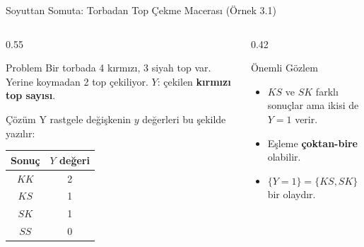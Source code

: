 ﻿\documentclass[light]{lutbeamer}
\begin{document}
\begin{frame}{Soyuttan Somuta: Torbadan Top Çekme Macerası (Örnek 3.1)}
\footnotesize
\begin{columns}[T]
  \begin{column}{0.55\textwidth}
    \begin{block}{Problem}
      Bir torbada 4 kırmızı, 3 siyah top var. Yerine koymadan 2 top çekiliyor.
      $Y$: çekilen \textbf{kırmızı top sayısı}.
    \end{block}

    \begin{alertblock}{Çözüm}
      Y rastgele değişkenin $y$ değerleri bu şekilde yazılır:
      \vspace{0.15cm}\\
      \centering
      \begin{tabular}{cc}
        \toprule
        Sonuç & $Y$ değeri \\
        \midrule
        $KK$ & 2 \\
        $KS$ & 1 \\
        $SK$ & 1 \\
        $SS$ & 0 \\
        \bottomrule
      \end{tabular}
    \end{alertblock}
  \end{column}
  \begin{column}{0.42\textwidth}
    \begin{block}{Önemli Gözlem}
      \begin{itemize}
        \item $KS$ ve $SK$ farklı sonuçlar ama ikisi de $Y=1$ verir.
        \item Eşleme \textbf{çoktan-bire} olabilir.
        \item $\{Y=1\} = \{KS, SK\}$ bir olaydır.
      \end{itemize}
    \end{block}
  \end{column}
\end{columns}
\end{frame}
\end{document}
